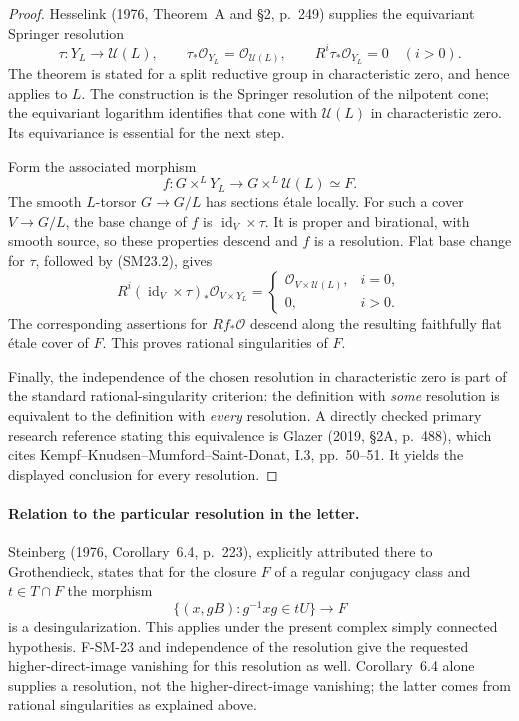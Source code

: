 \documentclass[11pt,a4paper]{article}
\theoremstyle{definition}\newtheorem{definition}[theorem]{Definition}
\theoremstyle{remark}\newtheorem{remark}[theorem]{Remark}
\begin{document}
\begin{proof}
Hesselink (1976, Theorem~A and \S2, p.~249) supplies the
equivariant Springer resolution
\[
 \tau:Y_L\longrightarrow\mathcal U(L),\qquad
 \tau_*\mathcal O_{Y_L}=\mathcal O_{\mathcal U(L)},\qquad
 R^i\tau_*\mathcal O_{Y_L}=0\quad(i>0).
 \tag{SM23.2}
\]
The theorem is stated for a split reductive group in
characteristic zero, and hence applies to $L$.
The construction is the Springer resolution of the nilpotent
cone; the equivariant logarithm identifies that cone with
$\mathcal U(L)$ in characteristic zero.  Its equivariance is
essential for the next step.

Form the associated morphism
\[
 f:G\times^L Y_L\longrightarrow G\times^L\mathcal U(L)\simeq F.
\]
The smooth $L$-torsor $G\to G/L$ has sections \'etale locally.
For such a cover $V\to G/L$, the base change of $f$ is
$\operatorname{id}_V\times\tau$.
It is proper and birational, with smooth source, so these
properties descend and $f$ is a resolution.
Flat base change for $\tau$, followed by (SM23.2), gives
\[
 R^i(\operatorname{id}_V\times\tau)_*
       \mathcal O_{V\times Y_L}
 =
 \begin{cases}
 \mathcal O_{V\times\mathcal U(L)},&i=0,\\
 0,&i>0.
 \end{cases}
\]
The corresponding assertions for $Rf_*\mathcal O$ descend along
the resulting faithfully flat \'etale cover of $F$.
This proves rational singularities of $F$.

Finally, the independence of the chosen resolution in
characteristic zero is part of the standard rational-singularity
criterion: the definition with \emph{some} resolution is equivalent
to the definition with \emph{every} resolution.  A directly checked
primary research reference stating this equivalence is
Glazer (2019, \S2A, p.~488), which cites
Kempf--Knudsen--Mumford--Saint-Donat, I.3, pp.~50--51.
It yields the displayed conclusion for every resolution.
\end{proof}

\paragraph{Relation to the particular resolution in the letter.}
Steinberg (1976, Corollary~6.4, p.~223), explicitly attributed
there to Grothendieck, states that for the closure $F$ of a regular
conjugacy class and $t\in T\cap F$ the morphism
\[
 \{(x,gB):g^{-1}xg\in tU\}\longrightarrow F
\]
is a desingularization.  This applies under the present complex
simply connected hypothesis.  F-SM-23 and independence of the
resolution give the requested higher-direct-image vanishing for
this resolution as well.  Corollary~6.4 alone supplies a
resolution, not the higher-direct-image vanishing; the latter
comes from rational singularities as explained above.
\end{document}
